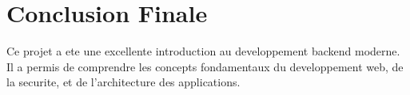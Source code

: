 \documentclass[a4paper,12pt]{book}
\begin{document}






\section{Conclusion Finale}

Ce projet a ete une excellente introduction au developpement backend moderne. Il a permis de comprendre les concepts fondamentaux du developpement web, de la securite, et de l'architecture des applications.
\end{document}
